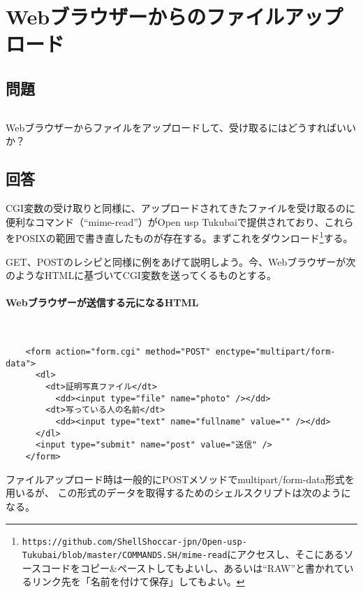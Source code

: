 \section{Webブラウザーからのファイルアップロード}
\label{recipe:file_upload}

\subsection*{問題}
\noindent
$\!\!\!\!\!$
\begin{grshfboxit}{160.0mm}
	Webブラウザーからファイルをアップロードして、受け取るにはどうすればいいか？
\end{grshfboxit}

\subsection*{回答}
CGI変数の受け取りと同様に、アップロードされてきたファイルを受け取るのに便利なコマンド（``mime-read''）がOpen usp Tukubaiで提供されており、これらをPOSIXの範囲で書き直したものが存在する。まずこれをダウンロード\footnote{\verb|https://github.com/ShellShoccar-jpn/Open-usp-Tukubai/blob/master/COMMANDS.SH/mime-read|にアクセスし、そこにあるソースコードをコピー\&{}ペーストしてもよいし、あるいは``RAW''と書かれているリンク先を「名前を付けて保存」してもよい。}する。

GET、POSTのレシピと同様に例をあげて説明しよう。今、Webブラウザーが次のようなHTMLに基づいてCGI変数を送ってくるものとする。
\paragraph{Webブラウザーが送信する元になるHTML} 　\\
\begin{frameboxit}{160.0mm}
\begin{verbatim}
	<form action="form.cgi" method="POST" enctype="multipart/form-data">
	  <dl>
	    <dt>証明写真ファイル</dt>
	      <dd><input type="file" name="photo" /></dd>
	    <dt>写っている人の名前</dt>
	      <dd><input type="text" name="fullname" value="" /></dd>
	  </dl>
	  <input type="submit" name="post" value="送信" />
	</form>
\end{verbatim}
\end{frameboxit}

ファイルアップロード時は一般的にPOSTメソッドでmultipart/form-data形式を用いるが、
この形式のデータを取得するためのシェルスクリプトは次のようになる。
